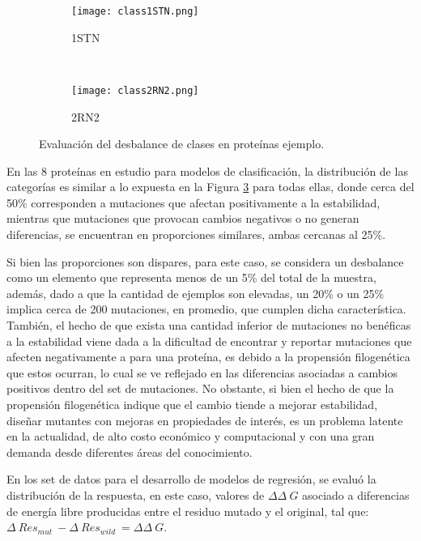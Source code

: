 \begin{figure}[!h]
	\centering
	\begin{subfigure}{0.8\textwidth}
		\texttt{[image: class1STN.png]}
		\caption{1STN}
		\label{fig:des1}
	\end{subfigure}
	~ %
	\begin{subfigure}{0.8\textwidth}
		\texttt{[image: class2RN2.png]}
		\caption{2RN2}
		\label{fig:des2}
	\end{subfigure}
	
	\caption{Evaluación del desbalance de clases en proteínas ejemplo.}
	\label{fig:desbalance}
\end{figure}

En las 8 proteínas en estudio para modelos de clasificación, la distribución de las categorías es similar a lo expuesta en la Figura \ref{fig:desbalance} para todas ellas, donde cerca del 50\% corresponden a mutaciones que afectan positivamente a la estabilidad, mientras que mutaciones que provocan cambios negativos o no generan diferencias, se encuentran en proporciones similares, ambas cercanas al 25\%. 

Si bien las proporciones son dispares, para este caso, se considera un desbalance como un elemento que representa menos de un 5\% del total de la muestra, además, dado a que la cantidad de ejemplos son elevadas, un 20\% o un 25\% implica cerca de 200 mutaciones, en promedio, que cumplen dicha característica. También, el hecho de que exista una cantidad inferior de mutaciones no benéficas a la estabilidad viene dada a la dificultad de encontrar y reportar mutaciones que afecten negativamente a para una proteína, es debido a la propensión filogenética \cite{Olivera-Nappa2011} que estos ocurran, lo cual se ve reflejado en las diferencias asociadas a cambios positivos dentro del set de mutaciones. No obstante, si bien el hecho de que la propensión filogenética indique que el cambio tiende a mejorar estabilidad, diseñar mutantes con mejoras en propiedades de interés, es un problema latente en la actualidad, de alto costo económico y computacional y con una gran demanda desde diferentes áreas del conocimiento.

En los set de datos para el desarrollo de modelos de regresión, se evaluó la distribución de la respuesta, en este caso, valores de $\Delta\Delta\ G$ asociado a diferencias de energía libre producidas entre el residuo mutado y el original, tal que: $\Delta\ Res_{mut}\ - \Delta\ Res_{wild}\ = \Delta\Delta\ G$. 

